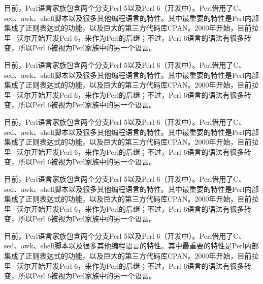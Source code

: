 	目前，Perl语言家族包含两个分支Perl 5以及Perl 6（开发中）。Perl借用了C、sed、awk、shell脚本以及很多其他编程语言的特性。其中最重要的特性是Perl内部集成了正则表达式的功能，以及巨大的第三方代码库CPAN。2000年开始，目前拉里·沃尔开始开发Perl 6，来作为Perl的后继；不过，Perl 6语言的语法有很多转变，所以Perl 6被视为Perl家族中的另一个语言。
	
	目前，Perl语言家族包含两个分支Perl 5以及Perl 6（开发中）。Perl借用了C、sed、awk、shell脚本以及很多其他编程语言的特性。其中最重要的特性是Perl内部集成了正则表达式的功能，以及巨大的第三方代码库CPAN。2000年开始，目前拉里·沃尔开始开发Perl 6，来作为Perl的后继；不过，Perl 6语言的语法有很多转变，所以Perl 6被视为Perl家族中的另一个语言。
	
	目前，Perl语言家族包含两个分支Perl 5以及Perl 6（开发中）。Perl借用了C、sed、awk、shell脚本以及很多其他编程语言的特性。其中最重要的特性是Perl内部集成了正则表达式的功能，以及巨大的第三方代码库CPAN。2000年开始，目前拉里·沃尔开始开发Perl 6，来作为Perl的后继；不过，Perl 6语言的语法有很多转变，所以Perl 6被视为Perl家族中的另一个语言。
	
	目前，Perl语言家族包含两个分支Perl 5以及Perl 6（开发中）。Perl借用了C、sed、awk、shell脚本以及很多其他编程语言的特性。其中最重要的特性是Perl内部集成了正则表达式的功能，以及巨大的第三方代码库CPAN。2000年开始，目前拉里·沃尔开始开发Perl 6，来作为Perl的后继；不过，Perl 6语言的语法有很多转变，所以Perl 6被视为Perl家族中的另一个语言。
	
	目前，Perl语言家族包含两个分支Perl 5以及Perl 6（开发中）。Perl借用了C、sed、awk、shell脚本以及很多其他编程语言的特性。其中最重要的特性是Perl内部集成了正则表达式的功能，以及巨大的第三方代码库CPAN。2000年开始，目前拉里·沃尔开始开发Perl 6，来作为Perl的后继；不过，Perl 6语言的语法有很多转变，所以Perl 6被视为Perl家族中的另一个语言。